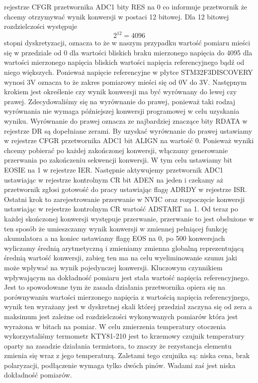 \documentclass{article}
\begin{document}
rejestrze CFGR przetwornika ADC1 bity RES na 0 co informuje przetwornik że chcemy otrzymywać
wynik konwersji w postaci 12 bitowej.
Dla 12 bitowej rozdzielczości występuje $$ 2^{12} = 4096 $$ stopni dyskretyzacji, oznacza to że w
naszym przypadku wartość pomiaru mieści się w przedziale od 0 dla wartości bliskich braku mierzonego
napięcia do 4095 dla wartości mierzonego napięcia bliskich wartości napięcia referencyjnego bądź od
niego większych. Ponieważ napięcie referencyjne w płytce STM32F3DISCOVERY wynosi 3V oznacza
to że zakres pomiarowy mieści się od 0V do 3V.
Następnym krokiem jest określenie czy wynik konwersji ma być wyrównany do lewej czy
prawej. Zdecydowaliśmy się na wyrównanie do prawej, ponieważ taki rodzaj wyrównania nie wymaga
późniejszej konwersji programowej w celu uzyskania wyniku. Wyrównanie do prawej oznacza ze
najbardziej znaczące bity RDATA w rejestrze DR są dopełniane zerami.
By uzyskać wyrównanie do prawej ustawiamy w rejestrze CFGR przetwornika ADC1 bit ALIGN
na wartość 0.
Ponieważ wyniki chcemy pobierać po każdej zakończonej konwersji, włączamy generowanie
przerwania po zakończeniu sekwencji konwersji. W tym celu ustawiamy bit EOSIE na 1 w rejestrze IER.
Następnie aktywujemy przetwornik ADC1 ustawiając w rejestrze kontrolnym CR bit ADEN na
jeden i czekamy aż przetwornik zgłosi gotowość do pracy ustawiając flagę ADRDY w rejestrze ISR.
Ostatni krok to zarejestrowanie przerwanie w NVIC oraz rozpoczęcie konwersji ustawiając w
rejestrze kontrolnym CR wartość ADSTART na 1.
Od teraz po każdej skończonej konwersji występuje przerwanie, przerwanie to jest obsłużone w ten
sposób że umieszczamy wynik konwersji w zmiennej pełniącej funkcję akumulatora a na koniec
ustawiamy flagę EOS na 0, po 500 konwersjach wyliczamy średnią arytmetyczną i zmieniamy zmienna
globalną reprezentującą średnią wartość konwersji, zabieg ten ma na celu wyeliminowanie szumu jaki
może wpływać na wynik pojedynczej konwersji.
Kluczowym czynnikiem wpływającym na dokładność pomiaru jest stała wartość napięcia
referencyjnego. Jest to spowodowane tym że zasada działania przetwornika opiera się na porównywaniu
wartości mierzonego napięcia z wartością napięcia referencyjnego, wynik ten wyrażany jest w dyskretnej
skali której przedział zaczyna się od zera a maksimum jest zależne od rozdzielczości wykonywanych
pomiarów która jest wyrażona w bitach na pomiar.
W celu zmierzenia temperatury otoczenia wykorzystaliśmy termometr KTY81-210 jest to
krzemowy czujnik temperatury oparty na zasadzie działania termistora, to znaczy że rezystancja elementu
zmienia się wraz z jego temperaturą. Zaletami tego czujnika są: niska cena, brak polaryzacji, podłączenie
wymaga tylko dwóch pinów. Wadami zaś jest niska dokładność pomiarów.
\end{document}
